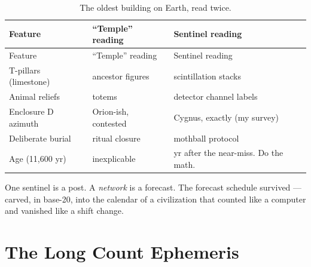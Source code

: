 \documentclass[
  english,
  11pt,
  letterpaper,
]{scrbook}
\begin{document}
\begin{longtable}[]{@{}
  >{\raggedright\arraybackslash}p{}
  >{\raggedright\arraybackslash}p{}
  >{\raggedright\arraybackslash}p{}@{}}
\caption{The oldest building on Earth, read
twice.}\label{tbl-tepe}\tabularnewline
\toprule\noalign{}
\begin{minipage}[b]{\linewidth}\raggedright
Feature
\end{minipage} & \begin{minipage}[b]{\linewidth}\raggedright
``Temple'' reading
\end{minipage} & \begin{minipage}[b]{\linewidth}\raggedright
Sentinel reading
\end{minipage} \\
\midrule\noalign{}
\endfirsthead
\toprule\noalign{}
\begin{minipage}[b]{\linewidth}\raggedright
Feature
\end{minipage} & \begin{minipage}[b]{\linewidth}\raggedright
``Temple'' reading
\end{minipage} & \begin{minipage}[b]{\linewidth}\raggedright
Sentinel reading
\end{minipage} \\
\midrule\noalign{}
\endhead
\bottomrule\noalign{}
\endlastfoot
T-pillars (limestone) & ancestor figures & scintillation stacks \\
Animal reliefs & totems & detector channel labels \\
Enclosure D azimuth & Orion-ish, contested & Cygnus, exactly (my
survey) \\
Deliberate burial & ritual closure & mothball protocol \\
Age (11,600 yr) & inexplicable & 300 yr after the near-miss. Do the
math. \\
\end{longtable}

One sentinel is a post. A \emph{network} is a forecast. The forecast
schedule survived --- carved, in base-20, into the calendar of a
civilization that counted like a computer and vanished like a shift
change.

\chapter{The Long Count Ephemeris}\label{sec-long-count}
\end{document}
